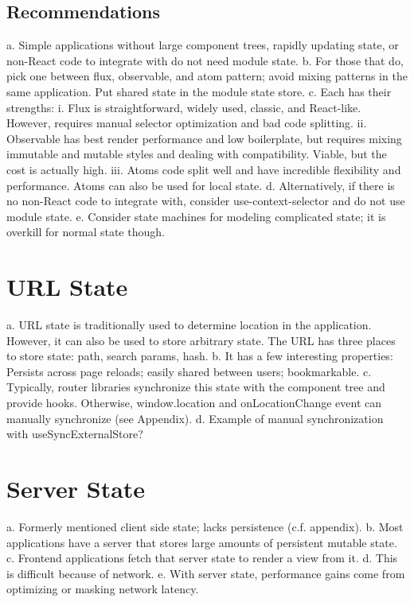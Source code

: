 \documentclass{article}
\begin{document}
\subsection{Recommendations}

a. Simple applications without large component trees, rapidly updating state, or non-React code to integrate with do not need module state.
b. For those that do, pick one between flux, observable, and atom pattern; avoid mixing patterns in the same application. Put shared state in the module state store.
c. Each has their strengths:
  i.   Flux is straightforward, widely used, classic, and React-like. However, requires manual selector optimization and bad code splitting.
  ii.  Observable has best render performance and low boilerplate, but requires mixing immutable and mutable styles and dealing with compatibility. Viable, but the cost is actually high.
  iii. Atoms code split well and have incredible flexibility and performance. Atoms can also be used for local state.
d. Alternatively, if there is no non-React code to integrate with, consider use-context-selector and do not use module state.
e. Consider state machines for modeling complicated state; it is overkill for normal state though.

\section{URL State}

a. URL state is traditionally used to determine location in the application. However, it can also be used to store arbitrary state. The URL has three places to store state: path, search params, hash.
b. It has a few interesting properties: Persists across page reloads; easily shared between users; bookmarkable.
c. Typically, router libraries synchronize this state with the component tree and provide hooks. Otherwise, window.location and onLocationChange event can manually synchronize (see Appendix).
d. Example of manual synchronization with useSyncExternalStore?

\section{Server State}

a. Formerly mentioned client side state; lacks persistence (c.f. appendix).
b. Most applications have a server that stores large amounts of persistent mutable state.
c. Frontend applications fetch that server state to render a view from it.
d. This is difficult because of network.
e. With server state, performance gains come from optimizing or masking network latency.
\end{document}
